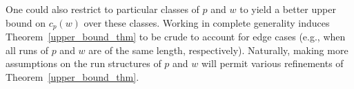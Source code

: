 \documentclass[11pt]{amsart}
\begin{document}
One could also restrict to particular classes of $p$ and $w$ to yield a better upper bound on $c_p(w)$ over these classes. Working in complete generality induces Theorem~\ref{upper_bound_thm} to be crude to account for edge cases (e.g., when all runs of $p$ and $w$ are of the same length, respectively). Naturally, making more assumptions on the run structures of $p$ and $w$ will permit various refinements of Theorem~\ref{upper_bound_thm}.

\end{document}
